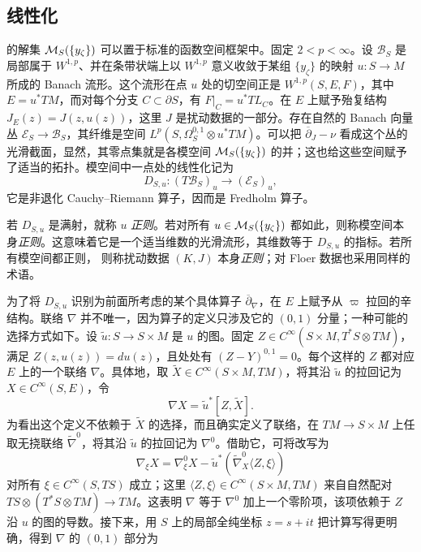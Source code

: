 \subsection{线性化}\label{sec:8i}
的解集 $\mathcal M_S(\{y_\zeta\})$ 可以置于标准的函数空间框架中。固定 $2<p<\infty$。设 $\mathcal B_S$ 是局部属于 $W^{1,p}$、并在条带状端上以 $W^{1,p}$ 意义收敛于某组 $\{y_\zeta\}$ 的映射 $u:S\to M$ 所成的 Banach 流形。这个流形在点 $u$ 处的切空间正是 $W^{1,p}(S,E,F)$，其中 $E=u^*TM$，而对每个分支 $C\subset\partial S$，有 $F|_C=u^*TL_C$。在 $E$ 上赋予殆复结构 $J_E(z)=J(z,u(z))$，这里 $J$ 是扰动数据的一部分。存在自然的 Banach 向量丛 $\mathcal E_S\to\mathcal B_S$，其纤维是空间 $L^p(S,\Omega_S^{0,1}\otimes u^*TM)$。可以把 $\overline\partial_J-\nu$ 看成这个丛的光滑截面，显然，其零点集就是各模空间 $\mathcal M_S(\{y_\zeta\})$ 的并；这也给这些空间赋予了适当的拓扑。模空间中一点处的线性化记为
\begin{equation}\label{eq:8.17}
D_{S,u}:(T\mathcal B_S)_u\longrightarrow(\mathcal E_S)_u,
\end{equation}
它是非退化 Cauchy–Riemann 算子，因而是 Fredholm 算子。
\begin{definition*}
若 $D_{S,u}$ 是满射，就称 $u$ \emph{正则}。若对所有 $u\in\mathcal M_S(\{y_\zeta\})$ 都如此，则称模空间本身\emph{正则}。这意味着它是一个适当维数的光滑流形，其维数等于 $D_{S,u}$ 的指标。若所有模空间都正则，
则称扰动数据 $(K,J)$ 本身\emph{正则}；对 Floer 数据也采用同样的术语。
\end{definition*}
为了将 $D_{S,u}$ 识别为前面所考虑的某个具体算子 $\overline\partial_\nabla$，在 $E$ 上赋予从 $\varpi$ 拉回的辛结构。联络 $\nabla$ 并不唯一，因为算子的定义只涉及它的 $(0,1)$ 分量；一种可能的选择方式如下。设 $\tilde u:S\to S\times M$ 是 $u$ 的图。固定 $Z\in C^\infty(S\times M,T^*S\otimes TM)$，满足 $Z(z,u(z))=du(z)$，且处处有 $(Z-Y)^{0,1}=0$。每个这样的 $Z$ 都对应 $E$ 上的一个联络 $\nabla$。具体地，取 $\widetilde X\in C^\infty(S\times M,TM)$，将其沿 $\tilde u$ 的拉回记为 $X\in C^\infty(S,E)$，令
\begin{equation}\label{eq:8.18}
\nabla X=\tilde u^*[Z,\widetilde X].
\end{equation}
为看出这个定义不依赖于 $\widetilde X$ 的选择，而且确实定义了联络，在 $TM\to S\times M$ 上任取无挠联络 $\widetilde\nabla^0$，将其沿 $\tilde u$ 的拉回记为 $\nabla^0$。借助它，可将改写为
\[
\nabla_\xi X=\nabla^0_\xi X-\tilde u^*(\widetilde\nabla^0_X\langle Z,\xi\rangle)
\]
对所有 $\xi\in C^\infty(S,TS)$ 成立；这里 $\langle Z,\xi\rangle\in C^\infty(S\times M,TM)$ 来自自然配对 $TS\otimes(T^*S\otimes TM)\to TM$。这表明 $\nabla$ 等于 $\nabla^0$ 加上一个零阶项，该项依赖于 $Z$ 沿 $u$ 的图的导数。接下来，用 $S$ 上的局部全纯坐标 $z=s+it$ 把计算写得更明确，得到 $\nabla$ 的 $(0,1)$ 部分为
